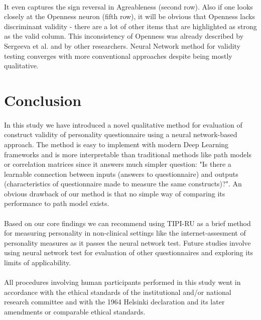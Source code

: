 \documentclass{llncs}
\begin{document}
\paragraph{}
It even captures the sign reversal in Agreableness (second row). Also if one looks closely at the Openness neuron (fifth row), it will be obvious that Openness lacks discriminant validity - there are a lot of other items that are highlighted as strong as the valid column. This inconsistency of Openness was already described by Sergeeva et al. and by other researchers. Neural Network method for validity testing converges with more conventional approaches despite being mostly qualitative.

\section{Conclusion}\label{sec:Conclusion}

\paragraph{}
In this study we have introduced a novel qualitative method for evaluation of construct validity of personality questionnaire using a neural network-based approach. The method is easy to implement with modern Deep Learning frameworks and is more interpretable than traditional methods like path models or correlation matrices since it answers much simpler question: "Is there a learnable connection between inputs (answers to questionnaire) and outputs (characteristics of questionnaire made to measure the same constructs)?". An obvious drawback of our method is that no simple way of comparing its performance to path model exists. 

\paragraph{}
Based on our core findings we can recommend using TIPI-RU as a brief method for measuring personality in non-clinical settings like the internet-assesment of personality measures as it passes the neural network test. Future studies involve using neural network test for evaluation of other questionnaires and exploring its limits of applicability. 

\paragraph{}
All procedures involving human participants  performed in this study went in accordance with the ethical standards of the institutional and/or national research committee and with the 1964 Helsinki declaration and its
later amendments or comparable ethical standards.
\end{document}

